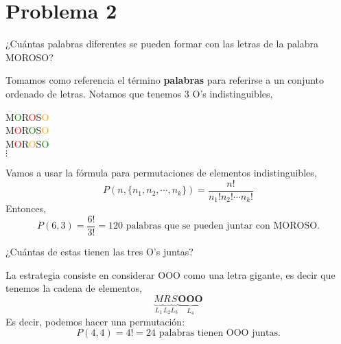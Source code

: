 \section{Problema 2}

¿Cuántas palabras diferentes se pueden formar con las letras de la palabra MOROSO?
\begin{solution} Tomamos como referencia el término \textbf{palabras} para referirse a un conjunto ordenado de letras. Notamos que tenemos 3 O's indistinguibles,
\begin{center}
    M\textcolor{green}{O}R\textcolor{red}{O}S\textcolor{orange}{O}\\
    M\textcolor{red}{O}R\textcolor{green}{O}S\textcolor{orange}{O}\\
    M\textcolor{red}{O}R\textcolor{orange}{O}S\textcolor{green}{O}\\
    $\vdots$
\end{center}
Vamos a usar la fórmula para permutaciones de elementos indistinguibles, 
$$P(n,\{n_1,n_2,\cdots, n_k\})=\frac{n!}{n_1!n_2!\cdots n_k!}$$
Entonces, 
$$P(6,3)=\frac{6!}{3!}=120 \text{ palabras que se pueden juntar con MOROSO.}$$
\end{solution}
¿Cuántas de estas tienen las tres O’s juntas?

\begin{solution}
La estrategia consiste en considerar OOO como una letra gigante, es decir que tenemos la cadena de elementos, 
$$
    \underbrace{M}_{L_1}\underbrace{R}_{L_2}\underbrace{S}_{L_3}\underbrace{\textbf{OOO}}_{L_4}
$$
Es decir, podemos hacer una permutación: 
$$P(4,4)=4!=24 \text{ palabras tienen OOO juntas.}$$
\end{solution}